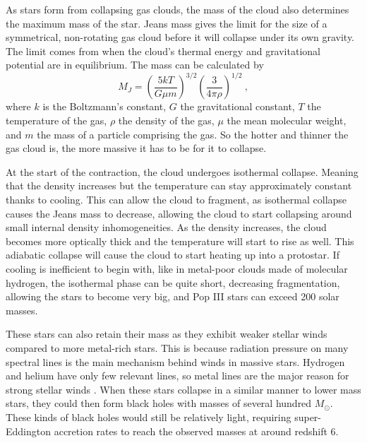 \documentclass[english, oneside]{HYgradu}
\begin{document}
As stars form from collapsing gas clouds, the mass of the cloud also determines the maximum mass of the star. Jeans mass gives the limit for the size of a symmetrical, non-rotating gas cloud before it will collapse under its own gravity. The limit comes from when the cloud's thermal energy and gravitational potential are in equilibrium. The mass can be calculated by
\begin{equation}
M_J = \left( \frac{5 k T}{G \mu m} \right)^{3/2} \left( \frac{3}{4 \pi \rho} \right)^{1/2} \ ,
\end{equation}
where $k$ is the Boltzmann's constant, $G$ the gravitational constant, $T$ the temperature of the gas, $\rho$ the density of the gas, $\mu$ the mean molecular weight, and $m$ the mass of a particle comprising the gas. So the hotter and thinner the gas cloud is, the more massive it has to be for it to collapse. 

At the start of the contraction, the cloud undergoes isothermal collapse. Meaning that the density increases but the temperature can stay approximately constant thanks to cooling. This can allow the cloud to fragment, as isothermal collapse causes the Jeans mass to decrease, allowing the cloud to start collapsing around small internal density inhomogeneities. As the density increases, the cloud becomes more optically thick and the temperature will start to rise as well. This adiabatic collapse will cause the cloud to start heating up into a protostar. If cooling is inefficient to begin with, like in metal-poor clouds made of molecular hydrogen, the isothermal phase can be quite short, decreasing fragmentation, allowing the stars to become very big, and Pop III stars can exceed 200 solar masses.

These stars can also retain their mass as they exhibit weaker stellar winds compared to more metal-rich stars. This is because radiation pressure on many spectral lines is the main mechanism behind winds in massive stars. Hydrogen and helium have only few relevant lines, so metal lines are the major reason for strong stellar winds \citep{vink:2001}. When these stars collapse in a similar manner to lower mass stars, they could then form black holes with masses of several hundred $M_\odot$. These kinds of black holes would still be relatively light, requiring super-Eddington accretion rates to reach the observed masses at around redshift 6.
\end{document}
